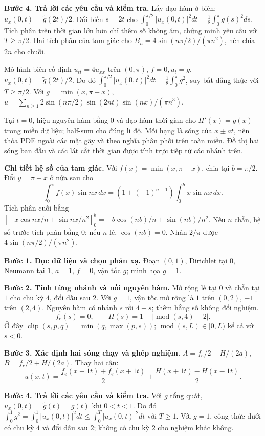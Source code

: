 \textbf{Bước 4. Trả lời các yêu cầu và kiểm tra.} Lấy đạo hàm ở biên: $u_x(0,t)=\widetilde g(2t)/2$. Đổi biến $s=2t$ cho $\int_0^{\pi/2}|u_x(0,t)|^2dt=\frac18\int_0^\pi g(s)^2ds$. Tích phân trên thời gian lớn hơn chỉ thêm số không âm, chứng minh yêu cầu với $T\ge\pi/2$. Hai tích phân của tam giác cho $B_n=4\sin(n\pi/2)/(\pi n^2)$, nên chia $2n$ cho chuỗi.

Mô hình biên cố định $u_{tt}=4u_{xx}$ trên $(0,\pi)$, $f=0,u_t=g$. $u_x(0,t)=\widetilde g(2t)/2$. Do đó $\int_0^{\pi/2}|u_x(0,t)|^2dt=\frac18\int_0^\pi g^2$, suy bất đẳng thức với $T\ge\pi/2$. Với $g=\min(x,\pi-x)$, $u=\sum_{n\ge1}2\sin(n\pi/2)\sin(2nt)\sin(nx)/(\pi n^3)$.

Tại $t=0$, hiệu nguyên hàm bằng $0$ và đạo hàm thời gian cho $H'(x)=g(x)$ trong miền dữ liệu; half-sum cho đúng li độ. Mỗi hạng là sóng của $x\pm at$, nên thỏa PDE ngoài các mặt gãy và theo nghĩa phân phối trên toàn miền. Đồ thị hai sóng ban đầu và các lát cắt thời gian được tính trực tiếp từ các nhánh trên.

\textbf{Chi tiết hệ số của tam giác.} Với $f(x)=\min(x,\pi-x)$, chia tại $b=\pi/2$. Đổi $y=\pi-x$ ở nửa sau cho
\[\int_0^\pi f(x)\sin nx\,dx=(1+(-1)^{n+1})\int_0^b x\sin nx\,dx.\]
Tích phân cuối bằng $[-x\cos nx/n+\sin nx/n^2]_0^b=-b\cos(nb)/n+\sin(nb)/n^2$. Nếu $n$ chẵn, hệ số trước tích phân bằng $0$; nếu $n$ lẻ, $\cos(nb)=0$. Nhân $2/\pi$ được $4\sin(n\pi/2)/(\pi n^2)$.

\textbf{Bước 1. Đọc dữ liệu và chọn phản xạ.} Đoạn $(0,1)$, Dirichlet tại $0$, Neumann tại $1$, $a=1$, $f=0$, vận tốc $g$; minh họa $g=1$.

\textbf{Bước 2. Tính từng nhánh và nối nguyên hàm.} Mở rộng lẻ tại $0$ và chẵn tại $1$ cho chu kỳ $4$, đổi dấu sau $2$. Với $g=1$, vận tốc mở rộng là $1$ trên $(0,2)$, $-1$ trên $(2,4)$. Nguyên hàm có nhánh $s$ rồi $4-s$; thêm hằng số không đổi nghiệm.
\[f_e(s)=0,\qquad H(s)=1-|\operatorname{mod}(s,4)-2|.\]
Ở đây $\operatorname{clip}(s,p,q)=\min(q,\max(p,s))$; $\operatorname{mod}(s,L)\in[0,L)$ kể cả với $s<0$.

\textbf{Bước 3. Xác định hai sóng chạy và ghép nghiệm.} $A=f_e/2-H/(2a)$, $B=f_e/2+H/(2a)$. Thay hai cận:
\[u(x,t)=\frac{f_e(x-1t)+f_e(x+1t)}2+\frac{H(x+1t)-H(x-1t)}{2}.\]

\textbf{Bước 4. Trả lời các yêu cầu và kiểm tra.} Với $g$ tổng quát, $u_x(0,t)=\widetilde g(t)=g(t)$ khi $0<t<1$. Do đó $\int_0^1g^2=\int_0^1|u_x(0,t)|^2dt\le\int_0^T|u_x(0,t)|^2dt$ với $T\ge1$. Với $g=1$, công thức dưới có chu kỳ $4$ và đổi dấu sau $2$; không có chu kỳ $2$ cho nghiệm khác không.

